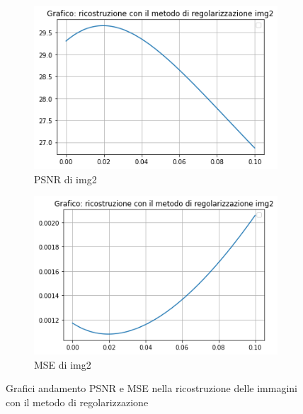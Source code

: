 \begin{figure}[H]
    \begin{subfigure}{0.5\textwidth}
        \centering
        \includegraphics[width=\textwidth]{output/PSNR/outputPSNR-img2.png}
        \caption{PSNR di img2}
        \label{fig:img2PSNR}
    \end{subfigure}\hfill
    \begin{subfigure}{0.5\textwidth}
        \centering
        \includegraphics[width=\textwidth]{output/MSE/outputMSE-img2.png}
        \caption{MSE di img2}
        \label{fig:img2MSE}
    \end{subfigure}
    \caption{Grafici andamento PSNR e MSE nella ricostruzione delle immagini con il metodo di regolarizzazione}
\end{figure}%
